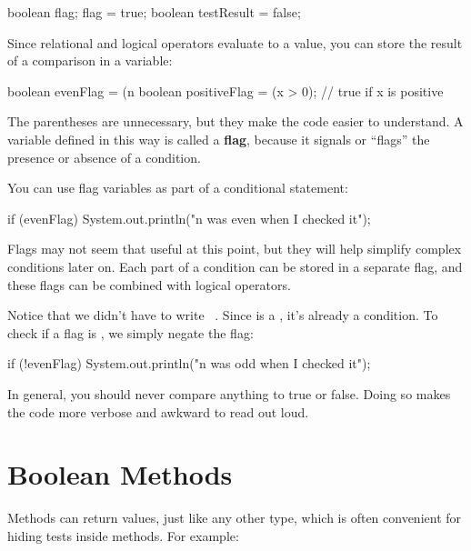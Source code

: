\begin{code}
boolean flag;
flag = true;
boolean testResult = false;
\end{code}


Since relational and logical operators evaluate to a  value, you can store the result of a comparison in a variable:

\begin{code}
boolean evenFlag = (n %
boolean positiveFlag = (x > 0);     // true if x is positive
\end{code}


The parentheses are unnecessary, but they make the code easier to understand.
A variable defined in this way is called a {\bf flag}, because it signals or ``flags'' the presence or absence of a condition.

You can use flag variables as part of a conditional statement:

\begin{code}
if (evenFlag) {
    System.out.println("n was even when I checked it");
}
\end{code}

Flags may not seem that useful at this point, but they will help simplify complex conditions later on.
Each part of a condition can be stored in a separate flag, and these flags can be combined with logical operators.

Notice that we didn't have to write ~.
Since  is a , it's already a condition.
To check if a flag is , we simply negate the flag:

\begin{code}
if (!evenFlag) {
    System.out.println("n was odd when I checked it");
}
\end{code}

In general, you should never compare anything to true or false.
Doing so makes the code more verbose and awkward to read out loud.


\section{Boolean Methods}
\label{boolmeth}


Methods can return  values, just like any other type, which is often convenient for hiding tests inside methods.
For example:

